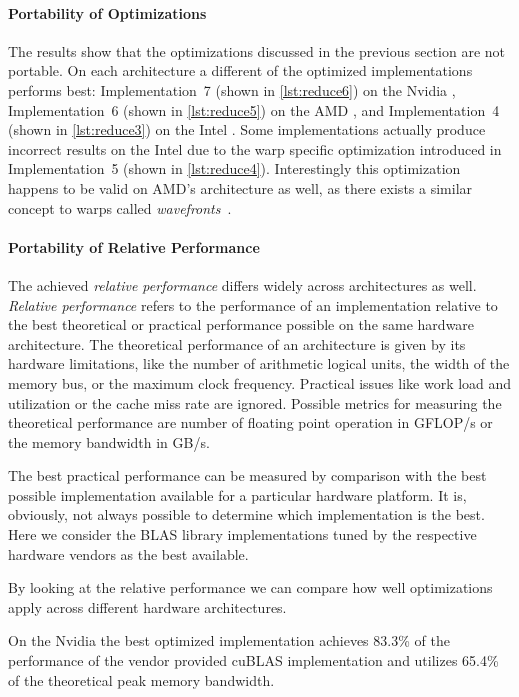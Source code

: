 \paragraph{Portability of Optimizations}
The results show that the optimizations discussed in the previous section are not portable. 
On each architecture a different of the optimized implementations performs best:
Implementation~7 (shown in \autoref{lst:reduce6}) on the Nvidia \GPU, Implementation~6 (shown in \autoref{lst:reduce5}) on the AMD \GPU, and Implementation~4 (shown in \autoref{lst:reduce3}) on the Intel \CPU.
Some implementations actually produce incorrect results on the Intel \CPU due to the warp specific optimization introduced in Implementation~5 (shown in \autoref{lst:reduce4}).
Interestingly this optimization happens to be valid on AMD's \GPU architecture as well, as there exists a similar concept to warps called \emph{wavefronts}~\cite{AMDGCN2012}.

\paragraph{Portability of Relative Performance}
The achieved \emph{relative performance} differs widely across architectures as well.
\emph{Relative performance} refers to the performance of an implementation relative to the best theoretical or practical performance possible on the same hardware architecture.
The theoretical performance of an architecture is given by its hardware limitations, like the number of arithmetic logical units, the width of the memory bus, or the maximum clock frequency.
Practical issues like work load and utilization or the cache miss rate are ignored.
Possible metrics for measuring the theoretical performance are number of floating point operation in GFLOP/s or the memory bandwidth in GB/s.

The best practical performance can be measured by comparison with the best possible implementation available for a particular hardware platform.
It is, obviously, not always possible to determine which implementation is the best.
Here we consider the BLAS library implementations tuned by the respective hardware vendors as the best available.

By looking at the relative performance we can compare how well optimizations apply across different hardware architectures.

On the Nvidia \GPU the best optimized implementation achieves 83.3\% of the performance of the vendor provided cuBLAS implementation and utilizes 65.4\% of the theoretical peak memory bandwidth.

